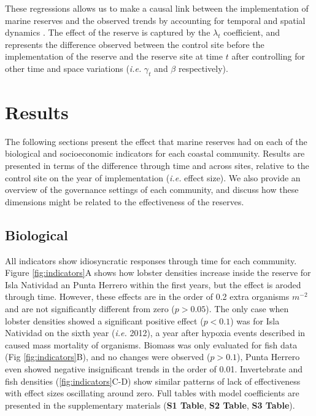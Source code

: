 \documentclass{frontiersSCNS}
\theoremstyle{definition}
\theoremstyle{definition}
\theoremstyle{definition}
\theoremstyle{remark}
\begin{document}
These regressions allows us to make a causal link between the
implementation of marine reserves and the observed trends by accounting
for temporal and spatial dynamics \citep{depalma_2018}. The effect of
the reserve is captured by the \(\lambda_t\) coefficient, and represents
the difference observed between the control site before the
implementation of the reserve and the reserve site at time \(t\) after
controlling for other time and space variations (\emph{i.e.}
\(\gamma_t\) and \(\beta\) respectively).

\section{Results}\label{results}

The following sections present the effect that marine reserves had on
each of the biological and socioeconomic indicators for each coastal
community. Results are presented in terms of the difference through time
and across sites, relative to the control site on the year of
implementation (\emph{i.e.} effect size). We also provide an overview of
the governance settings of each community, and discuss how these
dimensions might be related to the effectiveness of the reserves.

\subsection{Biological}\label{biological}

All indicators show idiosyncratic responses through time for each
community. Figure \ref{fig:indicators}A shows how lobster densities
increase inside the reserve for Isla Natividad an Punta Herrero within
the first years, but the effect is aroded through time. However, these
effects are in the order of 0.2 extra organisms \(m^{-2}\) and are not
significantly different from zero (\(p > 0.05\)). The only case when
lobster densities showed a significant positive effect (\(p < 0.1\)) was
for Isla Natividad on the sixth year (\emph{i.e.} 2012), a year after
hypoxia events described in \citet{micheli_2012-EU} caused mass
mortality of organisms. Biomass was only evaluated for fish data (Fig
\ref{fig:indicators}B), and no changes were observed (\(p > 0.1\)),
Punta Herrero even showed negative insignificant trends in the order of
0.01. Invertebrate and fish densities (\ref{fig:indicators}C-D) show
similar patterns of lack of effectiveness with effect sizes oscillating
around zero. Full tables with model coefficients are presented in the
supplementary materials (\textbf{S1 Table}, \textbf{S2 Table},
\textbf{S3 Table}).
\end{document}
